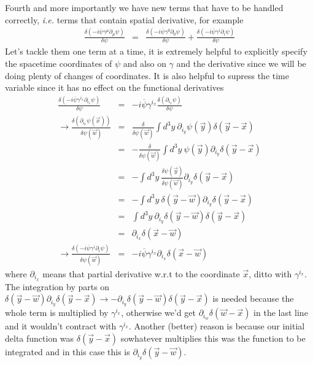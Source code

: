 \documentclass[aps,preprint,preprintnumbers,nofootinbib,showpacs,prd]{revtex4-1}
\newcommand{\ie}{{\it i.e.} }
\newcommand{\nbea}{\begin{eqnarray*}}
\newcommand{\neea}{\end{eqnarray*}}
\begin{document}
\item Fourth and more importantly we have new terms that have to be handled correctly, \ie terms that contain spatial derivative, for example
%
\nbea
\frac{\delta(-i \overline \psi \gamma^\mu \partial_\mu \psi)}{\delta \psi} & = & \frac{\delta(-i \overline \psi \gamma^0 \partial_0 \psi)}{\delta \psi} + \frac{\delta(-i \overline \psi \gamma^i \partial_i \psi)}{\delta \psi}
\neea
%
Let's tackle them one term at a time, it is extremely helpful to explicitly specify the spacetime coordinates of $\psi$ and also on $\gamma$ and the derivative since we will be doing plenty of changes of coordinates. It is also helpful to supress the time variable since it has no effect on the functional derivatives
%
\nbea
\frac{\delta(-i \overline \psi \gamma^{i_x} \partial_{i_x} \psi)}{\delta \psi} & = & -i \overline \psi \gamma^{i_x} \frac{\delta( \partial_{i_x} \psi)}{\delta \psi} \\
\to \frac{\delta( \partial_{i_x} \psi(\vec x))}{\delta \psi(\vec w)} & = & \frac{\delta}{\delta \psi(\vec w)} \int d^3y~\partial_{i_y} \psi(\vec y) \delta(\vec y-\vec x) \\
& = & -\frac{\delta}{\delta \psi(\vec w)} \int d^3y~\psi(\vec y) \partial_{i_y} \delta(\vec y-\vec x) \\
& = & - \int d^3y~\frac{\delta \psi(\vec y)}{\delta \psi(\vec w)} \partial_{i_y} \delta(\vec y-\vec x) \\
& = & - \int d^3y~\delta(\vec y-\vec w) \partial_{i_y} \delta(\vec y-\vec x) \\
& = & \int d^3y~\partial_{i_y}\delta(\vec y-\vec w) \delta(\vec y-\vec x) \\
& = & \partial_{i_x} \delta(\vec x-\vec w) \\
\to \frac{\delta(-i \overline \psi \gamma^i \partial_i \psi)}{\delta \psi(\vec w)} & = & -i \overline \psi \gamma^{i_x} \partial_{i_x} \delta(\vec x-\vec w) 
\neea
%
where $\partial_{i_x}$ means that partial derivative w.r.t to the coordinate $\vec x$, ditto with $\gamma^{i_x}$. The integration by parts on $\delta(\vec y-\vec w) \partial_{i_y} \delta(\vec y-\vec x) \to -\partial_{i_y}\delta(\vec y-\vec w) \delta(\vec y-\vec x)$ is needed because the whole term is multiplied by $\gamma^{i_x}$, otherwise we'd get $\partial_{i_w} \delta(\vec w-\vec x) $ in the last line and it wouldn't contract with $\gamma^{i_x}$. Another (better) reason is because our initial delta function was $\delta(\vec y-\vec x)$ sowhatever multiplies this was the function to be integrated and in this case this is $\partial_{i_y}\delta(\vec y-\vec w)$.
\end{document}
